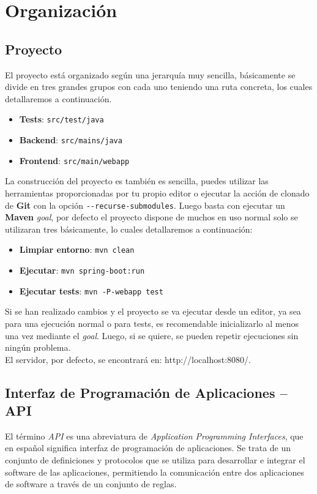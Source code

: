 \documentclass[../ei103948-project-documentation.tex]{subfiles}
\begin{document}
\section{Organización}
\subsection{Proyecto}

El proyecto está organizado según una jerarquía muy sencilla, básicamente se divide en tres grandes grupos con cada uno teniendo una ruta concreta, los cuales detallaremos a continuación.

    \begin{itemize}
        \item \textbf{Tests}: \texttt{src/test/java}
        \item \textbf{Backend}: \texttt{src/mains/java}
        \item \textbf{Frontend}: \texttt{src/main/webapp}
    \end{itemize}

La construcción del proyecto es también es sencilla, puedes utilizar las herramientas proporcionadas por tu propio editor o ejecutar la acción de clonado de \textbf{Git} con la opción \texttt{{-}{-}recurse-submodules}. Luego basta con ejecutar un \textbf{Maven} \textit{goal}, por defecto el proyecto dispone de muchos en uso normal solo se utilizaran tres básicamente, lo cuales detallaremos a continuación:

\begin{itemize}
    \item \textbf{Limpiar entorno}: \texttt{mvn clean}
    \item \textbf{Ejecutar}: \texttt{mvn spring-boot:run}
    \item \textbf{Ejecutar tests}:  \texttt{mvn -P-webapp test}
\end{itemize}

Si se han realizado cambios y el proyecto se va ejecutar desde un editor, ya sea para una ejecución normal o para tests, es recomendable inicializarlo al menos una vez mediante el \textit{goal}. Luego, si se quiere, se pueden repetir ejecuciones sin ningún problema.\\

El servidor, por defecto, se encontrará en: http://localhost:8080/.

\subsection{Interfaz de Programación de Aplicaciones -- API}
El término \textit{API}\cite{api-xataka} es una abreviatura de \textit{Application Programming Interfaces}, que en español significa interfaz de programación de aplicaciones. Se trata de un conjunto de definiciones y protocolos que se utiliza para desarrollar e integrar el software de las aplicaciones, permitiendo la comunicación entre dos aplicaciones de software a través de un conjunto de reglas.\\
\end{document}
